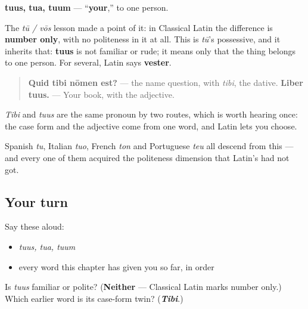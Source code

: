 \begin{cousinweb}
\textbf{tuus, tua, tuum} — \textquotedblleft{}\textbf{your},\textquotedblright{} to one person.

The \emph{tū / vōs} lesson made a point of it: in Classical Latin the difference is \textbf{number only}, with no politeness in it at all. This is \emph{tū}'s possessive, and it inherits that: \textbf{tuus} is not familiar or rude; it means only that the thing belongs to one person. For several, Latin says \textbf{vester}.

\begin{quote}
\textbf{Quid tibi nōmen est?} — the name question, with \emph{tibi}, the dative. \textbf{Liber tuus.} — Your book, with the adjective.
\end{quote}

\emph{Tibi} and \emph{tuus} are the same pronoun by two routes, which is worth hearing once: the case form and the adjective come from one word, and Latin lets you choose.

Spanish \emph{tu}, Italian \emph{tuo}, French \emph{ton} and Portuguese \emph{teu} all descend from this — and every one of them acquired the politeness dimension that Latin's had not got.
\end{cousinweb}

\subsection*{Your turn}
Say these aloud:

\begin{itemize}
\raggedright
  \item \emph{tuus, tua, tuum}
  \item every word this chapter has given you so far, in order
\end{itemize}

\begin{tcolorbox}[breakable,colback=teal!4,colframe=teal!35!black,title={Before you move on}]
Is \emph{tuus} familiar or polite? (\textbf{Neither} — Classical Latin marks number only.) Which earlier word is its case-form twin? (\emph{\textbf{Tibi}}.)
\end{tcolorbox}
